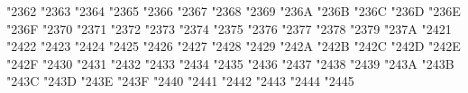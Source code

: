 {\Uchar\jis"2362 %
\Uchar\jis"2363 %
\Uchar\jis"2364 %
\Uchar\jis"2365 %
\Uchar\jis"2366 %
\Uchar\jis"2367 %
\Uchar\jis"2368 %
\Uchar\jis"2369 %
\Uchar\jis"236A %
\Uchar\jis"236B %
\Uchar\jis"236C %
\Uchar\jis"236D %
\Uchar\jis"236E %
\Uchar\jis"236F %
\Uchar\jis"2370 %
\Uchar\jis"2371 %
\Uchar\jis"2372 %
\Uchar\jis"2373 %
\Uchar\jis"2374 %
\Uchar\jis"2375 %
\Uchar\jis"2376 %
\Uchar\jis"2377 %
\Uchar\jis"2378 %
\Uchar\jis"2379 %
\Uchar\jis"237A %
\Uchar\jis"2421 %
\Uchar\jis"2422 %
\Uchar\jis"2423 %
\Uchar\jis"2424 %
\Uchar\jis"2425 %
\Uchar\jis"2426 %
\Uchar\jis"2427 %
\Uchar\jis"2428 %
\Uchar\jis"2429 %
\Uchar\jis"242A %
\Uchar\jis"242B %
\Uchar\jis"242C %
\Uchar\jis"242D %
\Uchar\jis"242E %
\Uchar\jis"242F %
\Uchar\jis"2430 %
\Uchar\jis"2431 %
\Uchar\jis"2432 %
\Uchar\jis"2433 %
\Uchar\jis"2434 %
\Uchar\jis"2435 %
\Uchar\jis"2436 %
\Uchar\jis"2437 %
\Uchar\jis"2438 %
\Uchar\jis"2439 %
\Uchar\jis"243A %
\Uchar\jis"243B %
\Uchar\jis"243C %
\Uchar\jis"243D %
\Uchar\jis"243E %
\Uchar\jis"243F %
\Uchar\jis"2440 %
\Uchar\jis"2441 %
\Uchar\jis"2442 %
\Uchar\jis"2443 %
\Uchar\jis"2444 %
\Uchar\jis"2445 %
}

